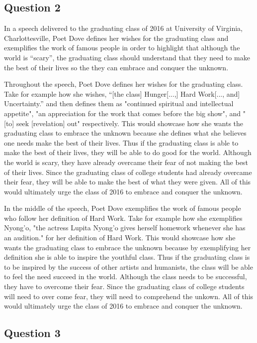 \documentclass[10pt]{article}
\begin{document}
\subsection{Question 2}

In a speech delivered to the graduating class of 2016 at University of Virginia, Charlottesville, Poet Dove defines her wishes for the graduating class and exemplifies the work of famous people in order to highlight that although the world is “scary”, the graduating class should understand that they need to make the best of their lives so the they can embrace and conquer the unknown.

Throughout the speech, Poet Dove defines her wishes for the graduating class. Take for example how she wishes, “[the class] Hunger[...,] Hard Work[..., and] Uncertainty.” and then defines them as "continued spiritual and intellectual appetite", "an appreciation for the work that comes before the big show", and "[to] seek [revelation] out" respectively. This would showcase how she wants the graduating class to embrace the unknown because she defines what she believes one needs make the best of their lives. Thus if the graduating class is able to make the best of their lives, they will be able to do good for the world. Although the world is scary, they have already overcame their fear of not making the best of their lives. Since the graduating class of college students had already overcame their fear, they will be able to make the best of what they were given. All of this would ultimately urge the class of 2016 to embrace and conquer the unknown.

In the middle of the speech, Poet Dove exemplifies the work of famous people who follow her definition of Hard Work. Take for example how she exemplifies Nyong'o, "the actress Lupita Nyong’o gives herself homework whenever she has an audition." for her definition of Hard Work. This would showcase how she wants the graduating class to embrace the unknown because by exemplifying her definition she is able to inspire the youthful class. Thus if the graduating class is to be inspired by the success of other artists and humanists, the class will be able to feel the need succeed in the world. Although the class needs to be successful, they have to overcome their fear. Since the graduating class of college students will need to over come fear, they will need to comprehend the unkown. All of this would ultimately urge the class of 2016 to embrace and conquer the unknown.

\subsection{Question 3}
\end{document}
